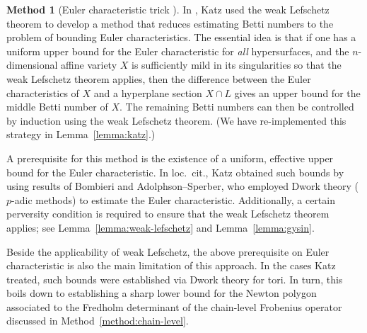 \documentclass[english]{smfart}
\theoremstyle{remark}
\theoremstyle{plain}
\theoremstyle{definition}
\numberwithin{equation}{remark}
\theoremstyle{void}
\newtheorem{method}[remark]{Method}
\begin{document}
\begin{method}[Euler characteristic trick \cite{katz_betti,zhang_betti}]
\label{method:euler-characteristic}
In \cite{katz_betti}, Katz used the weak Lefschetz theorem to develop
a method that reduces estimating Betti numbers to the problem of
bounding Euler characteristics.  The essential idea is that if one has
a uniform upper bound for the Euler characteristic for \emph{all}
hypersurfaces, and the \(n\)-dimensional affine variety \(X\) is
sufficiently mild in its singularities so that the weak Lefschetz
theorem applies, then the difference between the Euler characteristics
of \(X\) and a hyperplane section \(X \cap L\) gives an upper bound
for the middle Betti number of \(X\).  The remaining Betti numbers can
then be controlled by induction using the weak Lefschetz theorem. (We
have re-implemented this strategy in Lemma~\ref{lemma:katz}.)

A prerequisite for this method is the existence of a uniform,
effective upper bound for the Euler characteristic.  In loc.~cit.,
Katz obtained such bounds by using results of Bombieri and
Adolphson--Sperber, who employed Dwork theory (\(p\)-adic methods) to
estimate the Euler characteristic.  Additionally, a certain perversity
condition is required to ensure that the weak Lefschetz theorem
applies; see Lemma~\ref{lemma:weak-lefschetz} and
Lemma~\ref{lemma:gysin}.

Beside the applicability of weak Lefschetz, the above prerequisite on
Euler characteristic is also the main limitation of this approach.  In
the cases Katz treated, such bounds were established via Dwork theory
for tori.  In turn, this boils down to establishing a sharp lower
bound for the Newton polygon associated to the Fredholm determinant of
the chain-level Frobenius operator discussed in
Method~\ref{method:chain-level}.
\end{method}
\end{document}
